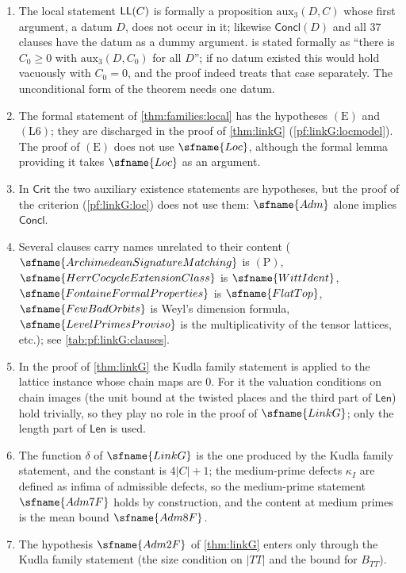 \begin{remark}\label{pf:linkG:rem}
\begin{enumerate}[label=(\arabic*)]
\item The local statement $\mathsf{LL}(C)$ is formally a proposition $\mathrm{aux}_3(D,C)$ whose first argument, a datum
$D$, does not occur in it; likewise $\mathsf{Concl}(D)$ and all $37$ clauses have the datum as a dummy argument.
 is stated formally as ``there is $C_0\ge0$ with $\mathrm{aux}_3(D,C_0)$ for all $D$''; if no
datum existed this would hold vacuously with $C_0=0$, and the proof indeed treats that case separately. The
unconditional form of the theorem needs one datum.
\item The formal statement of \cref{thm:families:local} has the hypotheses $(\mathrm E)$ and $(\mathrm L6)$; they are
discharged in the proof of \cref{thm:linkG} (\cref{pf:linkG:locmodel}). The proof of $(\mathrm E)$ does not use
$\sfname{Loc}$, although the formal lemma providing it takes $\sfname{Loc}$ as an argument.
\item In $\mathsf{Crit}$ the two auxiliary existence statements are hypotheses, but the proof of the
criterion (\cref{pf:linkG:loc}) does not use them: $\sfname{Adm}$ alone implies $\mathsf{Concl}$.
\item Several clauses carry names unrelated to their content ($\sfname{ArchimedeanSignatureMatching}$ is
$(\mathrm P)$, $\sfname{HerrCocycleExtensionClass}$ is $\sfname{WittIdent}$, $\sfname{FontaineFormalProperties}$ is
$\sfname{FlatTop}$, $\sfname{FewBadOrbits}$ is Weyl's dimension formula, $\sfname{LevelPrimesProviso}$ is the
multiplicativity of the tensor lattices, etc.); see \cref{tab:pf:linkG:clauses}.
\item In the proof of \cref{thm:linkG} the Kudla family statement is applied to the lattice instance whose chain maps
are $0$. For it the valuation conditions on chain images (the unit bound at the twisted places and the third part of
$\mathsf{Len}$) hold trivially, so they play no role in the proof of $\sfname{LinkG}$; only the length part of
$\mathsf{Len}$ is used.
\item The function $\delta$ of $\sfname{LinkG}$ is the one produced by the Kudla family statement, and the constant is
$4|C|+1$; the medium-prime defects $\kappa_I$ are defined as infima of admissible defects, so the medium-prime
statement $\sfname{Adm7F}$ holds by construction, and the content at medium primes is the mean bound $\sfname{Adm8F}$.
\item The hypothesis $\sfname{Adm2F}$ of \cref{thm:linkG} enters only through the Kudla family statement (the size
condition on $|TT|$ and the bound for $B_{TT}$).
\end{enumerate}
\end{remark}
